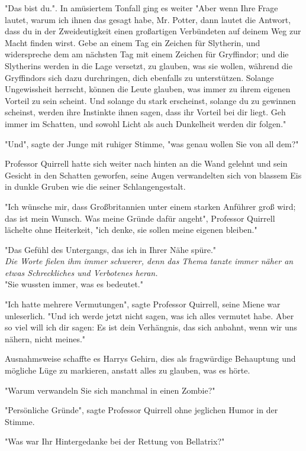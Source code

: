 {"Das bist du.". In amüsiertem Tonfall ging es weiter "Aber wenn Ihre Frage lautet, warum ich ihnen das gesagt habe, Mr. Potter, dann lautet die Antwort, dass du in der Zweideutigkeit einen großartigen Verbündeten auf deinem Weg zur Macht finden wirst. Gebe an einem Tag ein Zeichen für Slytherin, und widerspreche dem am nächsten Tag mit einem Zeichen für Gryffindor; und die Slytherins werden in die Lage versetzt, zu glauben, was sie wollen, während die Gryffindors sich dazu durchringen, dich ebenfalls zu unterstützen. Solange Ungewissheit herrscht, können die Leute glauben, was immer zu ihrem eigenen Vorteil zu sein scheint. Und solange du stark erscheinst, solange du zu gewinnen scheinst, werden ihre Instinkte ihnen sagen, dass ihr Vorteil bei dir liegt. Geh immer im Schatten, und sowohl Licht als auch Dunkelheit werden dir folgen."

"Und", sagte der Junge mit ruhiger Stimme, "was genau wollen Sie von all dem?"

Professor Quirrell hatte sich weiter nach hinten an die Wand gelehnt und sein Gesicht in den Schatten geworfen, seine Augen verwandelten sich von blassem Eis in dunkle Gruben wie die seiner Schlangengestalt.

"Ich wünsche mir, dass Großbritannien unter einem starken Anführer groß wird; das ist mein Wunsch. Was meine Gründe dafür angeht", Professor Quirrell lächelte ohne Heiterkeit, "ich denke, sie sollen meine eigenen bleiben."

"Das Gefühl des Untergangs, das ich in Ihrer Nähe spüre."\\ \emph{Die Worte fielen ihm immer schwerer, denn das Thema tanzte immer näher an etwas Schreckliches und Verbotenes heran.}\\ "Sie wussten immer, was es bedeutet."

"Ich hatte mehrere Vermutungen", sagte Professor Quirrell, seine Miene war unleserlich. "Und ich werde jetzt nicht sagen, was ich alles vermutet habe. Aber so viel will ich dir sagen: Es ist dein Verhängnis, das sich anbahnt, wenn wir uns nähern, nicht meines."

Ausnahmsweise schaffte es Harrys Gehirn, dies als fragwürdige Behauptung und mögliche Lüge zu markieren, anstatt alles zu glauben, was es hörte.

"Warum verwandeln Sie sich manchmal in einen Zombie?"

"Persönliche Gründe", sagte Professor Quirrell ohne jeglichen Humor in der Stimme.

"Was war Ihr Hintergedanke bei der Rettung von Bellatrix?"

}
